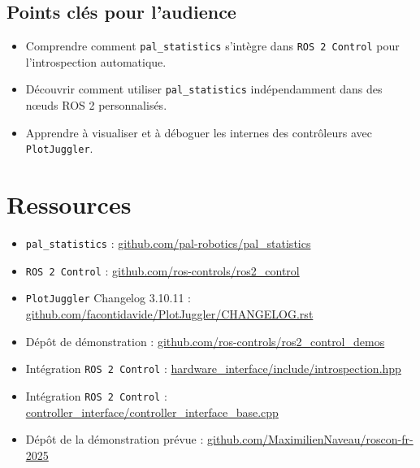 \documentclass[11pt,a4paper]{article}
\begin{document}
\subsection*{Points clés pour l'audience}

\begin{itemize}
    \item Comprendre comment \texttt{pal\_statistics} s'intègre dans
          \texttt{ROS 2 Control} pour l'introspection automatique.
    \item Découvrir comment utiliser \texttt{pal\_statistics} indépendamment
    dans des nœuds ROS 2 personnalisés.
    \item Apprendre à visualiser et à déboguer les internes des contrôleurs avec
          \texttt{PlotJuggler}.
\end{itemize}

\section*{Ressources}
\begin{itemize}
    \item \texttt{pal\_statistics} :
    \href{https://github.com/pal-robotics/pal_statistics}{github.com/pal-robotics/pal\_statistics}
    \item \texttt{ROS 2 Control} :
    \href{https://github.com/ros-controls/ros2_control}{github.com/ros-controls/ros2\_control}
    \item \texttt{PlotJuggler} Changelog 3.10.11 :
    \href{https://github.com/facontidavide/PlotJuggler/blob/main/CHANGELOG.rst}{github.com/facontidavide/PlotJuggler/CHANGELOG.rst}
    \item Dépôt de démonstration :
    \href{https://github.com/ros-controls/ros2_control_demos}{github.com/ros-controls/ros2\_control\_demos}
    \item Intégration \texttt{ROS 2 Control} :
    \href{https://github.com/ros-controls/ros2_control/blob/master/hardware_interface/include/hardware_interface/introspection.hpp}{hardware\_interface/include/introspection.hpp}
    \item Intégration \texttt{ROS 2 Control} :
    \href{https://github.com/ros-controls/ros2_control/blob/master/controller_interface/src/controller_interface_base.cpp#L180C3-L180C38}{controller\_interface/controller\_interface\_base.cpp}
    \item Dépôt de la démonstration prévue :
    \href{https://github.com/MaximilienNaveau/roscon-fr-2025}{github.com/MaximilienNaveau/roscon-fr-2025}
\end{itemize}
\end{document}
